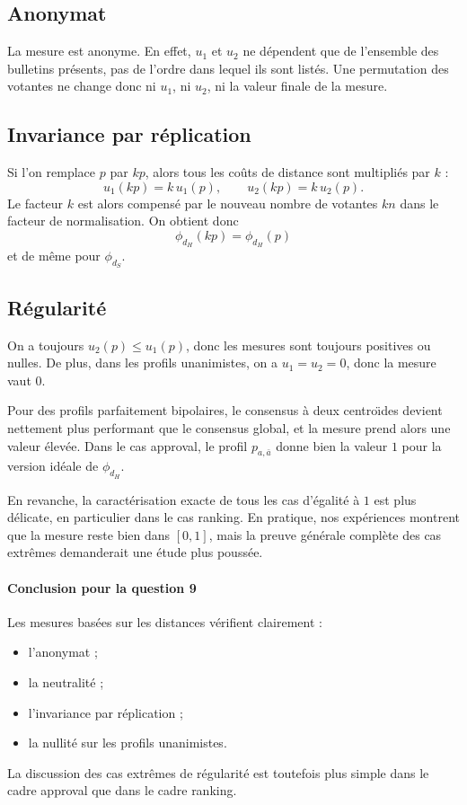 \documentclass[11pt,a4paper]{article}
\begin{document}
\subsection*{Anonymat}

La mesure est anonyme. En effet, \(u_1\) et \(u_2\) ne d\'ependent que de l'ensemble des bulletins pr\'esents, pas de l'ordre dans lequel ils sont list\'es. Une permutation des votantes ne change donc ni \(u_1\), ni \(u_2\), ni la valeur finale de la mesure.

\subsection*{Invariance par r\'eplication}

Si l'on remplace \(p\) par \(kp\), alors tous les co\^uts de distance sont multipli\'es par \(k\) :
\[
u_1(kp)=k\,u_1(p), \qquad u_2(kp)=k\,u_2(p).
\]
Le facteur \(k\) est alors compens\'e par le nouveau nombre de votantes \(kn\) dans le facteur de normalisation. On obtient donc
\[
\phi_{d_H}(kp)=\phi_{d_H}(p)
\]
et de m\^eme pour \(\phi_{d_S}\).

\subsection*{R\'egularit\'e}

On a toujours \(u_2(p)\le u_1(p)\), donc les mesures sont toujours positives ou nulles. De plus, dans les profils unanimistes, on a \(u_1=u_2=0\), donc la mesure vaut \(0\).

Pour des profils parfaitement bipolaires, le consensus \`a deux centro\"\i des devient nettement plus performant que le consensus global, et la mesure prend alors une valeur \'elev\'ee. Dans le cas approval, le profil \(p_{a,\bar a}\) donne bien la valeur \(1\) pour la version id\'eale de \(\phi_{d_H}\).

En revanche, la caract\'erisation exacte de tous les cas d'\'egalit\'e \`a \(1\) est plus d\'elicate, en particulier dans le cas ranking. En pratique, nos exp\'eriences montrent que la mesure reste bien dans \([0,1]\), mais la preuve g\'en\'erale compl\`ete des cas extr\^emes demanderait une \'etude plus pouss\'ee.

\paragraph{Conclusion pour la question 9}
Les mesures bas\'ees sur les distances v\'erifient clairement :
\begin{itemize}[leftmargin=*]
    \item l'anonymat ;
    \item la neutralit\'e ;
    \item l'invariance par r\'eplication ;
    \item la nullit\'e sur les profils unanimistes.
\end{itemize}
La discussion des cas extr\^emes de r\'egularit\'e est toutefois plus simple dans le cadre approval que dans le cadre ranking.
\end{document}
